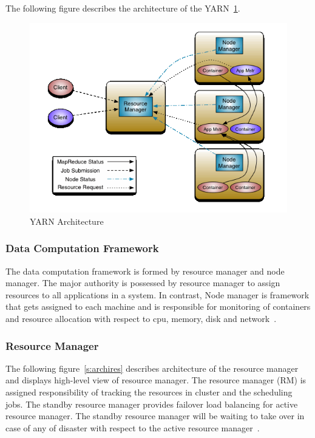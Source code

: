 The following figure describes the architecture 
of the YARN~\ref{s:archiyarn}.

\begin{figure}[!ht]
\centering\includegraphics[width=\textwidth]{images/YARNArchitecture.png}
\caption{YARN 
Architecture~\cite{hid-sp18-412-YARN_Architecture}}\label{s:archiyarn}
\end{figure}

\subsubsection{Data Computation Framework}
The data computation framework is formed by resource manager 
and node manager. The major authority is possessed  
by resource manager to assign resources to all 
applications in a system. In contrast, 
Node manager is framework that gets assigned 
to each machine and is responsible for monitoring of 
containers and resource allocation with 
respect to cpu, memory, disk 
and network~\cite{hid-sp18-412-YARN_Architecture}.


\subsubsection{Resource Manager}
The following figure~\ref{s:archires} describes 
architecture of the 
resource manager and displays high-level view of 
resource manager. The resource manager (RM) is assigned
responsibility of tracking the resources in cluster and 
the scheduling jobs. The standby resource manager provides 
failover load balancing for active resource manager. 
The standby resource manager will be waiting to take 
over in case of any of disaster with 
respect to the active resource manager~\cite{hid-sp18-412-YARN_Architecture}.

